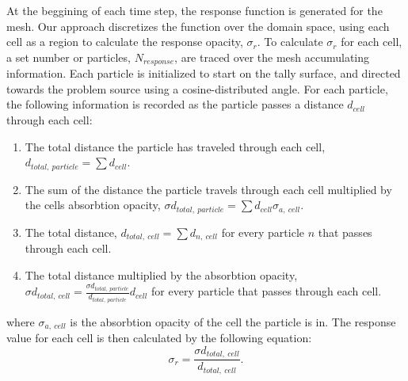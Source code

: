 \documentclass[]{article}
\begin{document}
    At the beggining of each time step, the response function is generated for the mesh. Our approach discretizes the function over the domain space, using each cell as a region to calculate the response opacity, $\sigma_{r}$. To calculate $\sigma_{r}$ for each cell, a set number or particles, $N_{response}$, are traced over the mesh accumulating information. Each particle is initialized to start on the tally surface, and directed towards the problem source using a cosine-distributed angle. For each particle, the following information is recorded as the particle passes a distance $d_{cell}$ through each cell: 
	\begin{enumerate}
		\item The total distance the particle has traveled through each cell, $d_{total,~particle} = \sum d_{cell}$.
		\item The sum of the distance the particle travels through each cell multiplied by the cells absorbtion opacity, $\sigma d_{total,~particle} = \sum d_{cell} \sigma_{a,~cell}$.
		\item The total distance, $d_{total,~cell} = \sum d_{n,~cell}$ for every particle $n$ that passes through each cell.
		\item The total distance multiplied by the absorbtion opacity, $\sigma d_{total,~cell} = \frac{\sigma d_{total,~particle}}{d_{total,~particle}} d_{cell}$ for every particle that passes through each cell.
	\end{enumerate}
	where $\sigma_{a,~cell}$ is the absorbtion opacity of the cell the particle is in. The response value for each cell is then calculated by the following equation:
	\begin{equation}
		\sigma_{r} = \frac{\sigma d_{total,~cell}}{d_{total,~cell}}.
	\end{equation}
	
\end{document}
